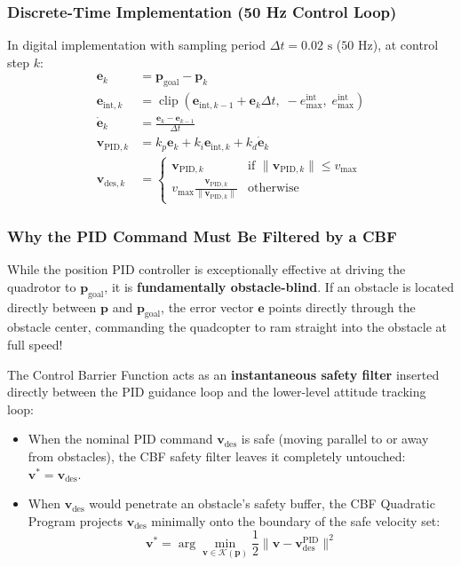 \documentclass[11pt,a4paper]{article}
\begin{document}
\subsubsection{Discrete-Time Implementation (50 Hz Control Loop)}
In digital implementation with sampling period $\Delta t = 0.02\text{ s}$ ($50\text{ Hz}$), at control step $k$:
\begin{align}
\mathbf{e}_k &= \mathbf{p}_{\mathrm{goal}} - \mathbf{p}_k \\
\mathbf{e}_{\mathrm{int}, k} &= \operatorname{clip}\left(\mathbf{e}_{\mathrm{int}, k-1} + \mathbf{e}_k \Delta t, \; -e_{\max}^{\mathrm{int}}, \; e_{\max}^{\mathrm{int}}\right) \\
\dot{\mathbf{e}}_k &= \frac{\mathbf{e}_k - \mathbf{e}_{k-1}}{\Delta t} \\
\mathbf{v}_{\mathrm{PID}, k} &= k_p \mathbf{e}_k + k_i \mathbf{e}_{\mathrm{int}, k} + k_d \dot{\mathbf{e}}_k \\
\mathbf{v}_{\mathrm{des}, k} &= \begin{cases} \mathbf{v}_{\mathrm{PID}, k} & \text{if } \|\mathbf{v}_{\mathrm{PID}, k}\| \le v_{\max} \\ v_{\max} \frac{\mathbf{v}_{\mathrm{PID}, k}}{\|\mathbf{v}_{\mathrm{PID}, k}\|} & \text{otherwise} \end{cases}
\end{align}

\subsubsection{Why the PID Command Must Be Filtered by a CBF}
While the position PID controller is exceptionally effective at driving the quadrotor to $\mathbf{p}_{\mathrm{goal}}$, it is \textbf{fundamentally obstacle-blind}. If an obstacle is located directly between $\mathbf{p}$ and $\mathbf{p}_{\mathrm{goal}}$, the error vector $\mathbf{e}$ points directly through the obstacle center, commanding the quadcopter to ram straight into the obstacle at full speed!

The Control Barrier Function acts as an \textbf{instantaneous safety filter} inserted directly between the PID guidance loop and the lower-level attitude tracking loop:
\begin{itemize}
    \item When the nominal PID command $\mathbf{v}_{\mathrm{des}}$ is safe (moving parallel to or away from obstacles), the CBF safety filter leaves it completely untouched: $\mathbf{v}^* = \mathbf{v}_{\mathrm{des}}$.
    \item When $\mathbf{v}_{\mathrm{des}}$ would penetrate an obstacle's safety buffer, the CBF Quadratic Program projects $\mathbf{v}_{\mathrm{des}}$ minimally onto the boundary of the safe velocity set:
    \begin{equation}
    \mathbf{v}^* = \arg\min_{\mathbf{v} \in \mathcal{K}(\mathbf{p})} \frac{1}{2} \|\mathbf{v} - \mathbf{v}_{\mathrm{des}}^{\mathrm{PID}}\|^2
    \end{equation}
\end{itemize}
\end{document}
